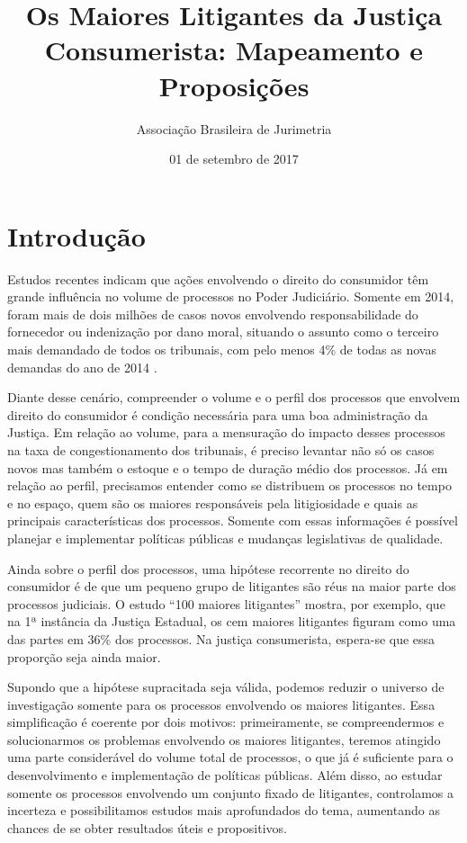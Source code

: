 \documentclass[]{report}
\title{Os Maiores Litigantes da Justiça Consumerista: Mapeamento e Proposições}
\author{Associação Brasileira de Jurimetria}
\date{01 de setembro de 2017}
\begin{document}
\maketitle

{
\hypersetup{linkcolor=black}
\setcounter{tocdepth}{2}
\tableofcontents
}
\listoftables
\listoffigures
\chapter{Introdução}\label{introducao}

Estudos recentes indicam que ações envolvendo o direito do consumidor
têm grande influência no volume de processos no Poder Judiciário.
Somente em 2014, foram mais de dois milhões de casos novos envolvendo
responsabilidade do fornecedor ou indenização por dano moral, situando o
assunto como o terceiro mais demandado de todos os tribunais, com pelo
menos 4\% de todas as novas demandas do ano de 2014 \citep{CNJ2015}.

Diante desse cenário, compreender o volume e o perfil dos processos que
envolvem direito do consumidor é condição necessária para uma boa
administração da Justiça. Em relação ao volume, para a mensuração do
impacto desses processos na taxa de congestionamento dos tribunais, é
preciso levantar não só os casos novos mas também o estoque e o tempo de
duração médio dos processos. Já em relação ao perfil, precisamos
entender como se distribuem os processos no tempo e no espaço, quem são
os maiores responsáveis pela litigiosidade e quais as principais
características dos processos. Somente com essas informações é possível
planejar e implementar políticas públicas e mudanças legislativas de
qualidade.

Ainda sobre o perfil dos processos, uma hipótese recorrente no direito
do consumidor é de que um pequeno grupo de litigantes são réus na maior
parte dos processos judiciais. O estudo ``100 maiores litigantes''
\citep{CNJ2012} mostra, por exemplo, que na 1ª instância da Justiça
Estadual, os cem maiores litigantes figuram como uma das partes em 36\%
dos processos. Na justiça consumerista, espera-se que essa proporção
seja ainda maior.

Supondo que a hipótese supracitada seja válida, podemos reduzir o
universo de investigação somente para os processos envolvendo os maiores
litigantes. Essa simplificação é coerente por dois motivos:
primeiramente, se compreendermos e solucionarmos os problemas envolvendo
os maiores litigantes, teremos atingido uma parte considerável do volume
total de processos, o que já é suficiente para o desenvolvimento e
implementação de políticas públicas. Além disso, ao estudar somente os
processos envolvendo um conjunto fixado de litigantes, controlamos a
incerteza e possibilitamos estudos mais aprofundados do tema, aumentando
as chances de se obter resultados úteis e propositivos.
\end{document}
